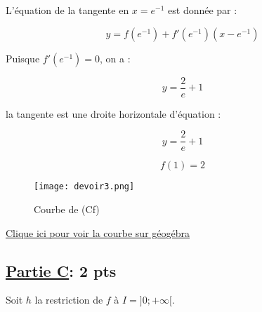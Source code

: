 \documentclass[12pt,a4paper]{article}
\begin{document}
\begin{enumerate}
          L'équation de la tangente en \( x = e^{-1} \) est donnée par :

          \[
              y = f(e^{-1}) + f'(e^{-1}) (x - e^{-1})
          \]

          Puisque \( f'(e^{-1}) = 0 \), on a :

          \[
              y = \frac{2}{e} + 1
          \]

          la tangente est une droite horizontale d'équation :

          \[
              y = \frac{2}{e} + 1
          \]

          \[f(1)=2\]

          \begin{center}
              \begin{figure}[H]%
                  \centering
                  \texttt{[image: devoir3.png]}
                  \caption{Courbe de (Cf)}
                  \label{fig:monimage}
              \end{figure}
              \href{https://www.geogebra.org/classic/tbcc6gcm}{Clique ici pour voir la courbe sur géogébra}\\
          \end{center}
\end{enumerate}
\subsection*{\underline{\textbf{Partie C}}:\textbf{ 2 pts}}

Soit \( h \) la restriction de \( f \) à \( I =]0; +\infty[ \).
\end{document}
